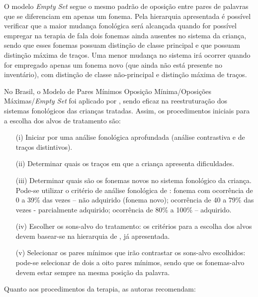 \documentclass[output=paper,colorlinks,citecolor=brown,booklanguage=portuguese]{langscibook}
\begin{document}
O modelo \emph{Empty Set} \citep{Gierut1992} segue o mesmo padrão de oposição entre pares de palavras que se diferenciam em apenas um fonema. Pela hierarquia apresentada é possível verificar que a maior mudança fonológica será alcançada quando for possível empregar na terapia de fala dois fonemas ainda ausentes no sistema da criança, sendo que esses fonemas possuam distinção de classe principal e que possuam distinção máxima de traços. Uma menor mudança no sistema irá ocorrer quando for empregado apenas um fonema novo (que ainda não está presente no inventário), com distinção de classe não-principal e distinção máxima de traços.

No Brasil, o Modelo de Pares Mínimos Oposição Mínima/Oposições Máximas{\slash}\emph{Emp\-ty Set} foi aplicado por \citet{Bagetti2005}, sendo eficaz na reestruturação dos sistemas fonológicos das crianças tratadas. Assim, os procedimentos iniciais para a escolha dos alvos de tratamento são:
\begin{itemize}
\item [(i)] Iniciar por uma análise fonológica aprofundada (análise contrastiva e de traços distintivos).
\item [(ii)] Determinar quais os traços em que a criança apresenta dificuldades.
\item [(iii)] Determinar quais são os fonemas novos no sistema fonológico da criança. Pode-se utilizar o critério de análise fonológica de \citet{Bernhardt1992}: fonema com ocorrência de 0 a 39\% das vezes -- não adquirido (fonema novo); ocorrência de 40 a 79\% das vezes - parcialmente adquirido; ocorrência de 80\% a 100\% -- adquirido.
\item [(iv)] Escolher os sons-alvo do tratamento: os critérios para a escolha dos alvos devem basear-se na hierarquia de \citet{Gierut1992}, já apresentada.
\item [(v)] Selecionar os pares mínimos que irão contrastar os sons-alvo escolhidos: pode-se selecionar de dois a oito pares mínimos, sendo que os fonemas-al\-vo devem estar sempre na mesma posição da palavra.
\end{itemize}

Quanto aos procedimentos da terapia, as autoras recomendam:
\end{document}
